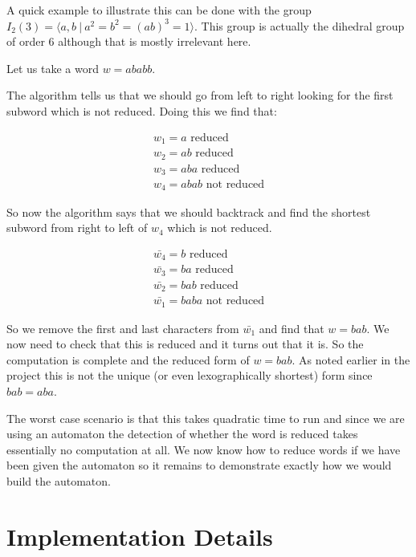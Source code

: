 \documentclass[a4paper,12pt]{article}
\begin{document}
\begin{example}
	A quick example to illustrate this can be done with the group $I_2(3) = \langle a,b \: | \: a^2 = b^2 = (ab)^3 = 1\rangle$. This group is actually the dihedral group of order 6 although that is mostly irrelevant here.
	
	Let us take a word $w = ababb$.
	
	The algorithm tells us that we should go from left to right looking for the first subword which is not reduced. Doing this we find that:
	
	\begin{align*}
		w_1 = a \text{ reduced} \\
		w_2 = ab \text{ reduced} \\
		w_3 = aba \text{ reduced} \\
		w_4 = abab \text{ not reduced}
	\end{align*}
	
	So now the algorithm says that we should backtrack and find the shortest subword from right to left of $w_4$ which is not reduced.
	
	\begin{align*}
		\bar{w_4} = b \text{ reduced} \\
		\bar{w_3} = ba \text{ reduced} \\
		\bar{w_2} = bab \text{ reduced} \\
		\bar{w_1} = baba \text{ not reduced}
	\end{align*}
	
	So we remove the first and last characters from $\bar{w_1}$ and find that $w = bab$. We now need to check that this is reduced and it turns out that it is. So the computation is complete and the reduced form of $w = bab$. As noted earlier in the project this is not the unique (or even lexographically shortest) form since $bab = aba$.
\end{example}

The worst case scenario is that this takes quadratic time to run and since we are using an automaton the detection of whether the word is reduced takes essentially no computation at all. We now know how to reduce words if we have been given the automaton so it remains to demonstrate exactly how we would build the automaton.

\section{Implementation Details}
\end{document}
